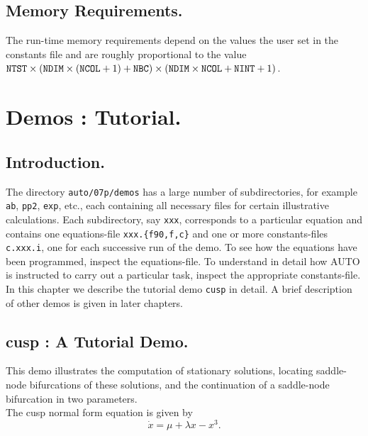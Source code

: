 \documentclass[12pt]{report}
\begin{document}
\section{ Memory Requirements.} \label{sec:Memory_requirements}
The run-time memory requirements depend on the values the user set in
the constants file and are roughly proportional to the value
${\tt NTST}\times({\tt NDIM}\times({\tt NCOL}+1)+{\tt NBC})\times
({\tt NDIM}\times{\tt NCOL}+{\tt NINT}+1)$.

\chapter{ \AUTO Demos : Tutorial.} \label{ch:Demos:_Tutorial}
\newpage
\section{ Introduction.} \label{sec:Tutorial_Introduction}
The directory {\tt auto/07p/demos} has a large number of subdirectories,
for example {\tt ab}, {\tt pp2}, {\tt exp}, etc.,
each containing all necessary files for certain illustrative calculations.
Each subdirectory, say {\tt xxx}, corresponds to a particular equation
and contains one equations-file {\tt xxx.\{f90,f,c\}}
and one or more constants-files {\tt c.xxx.i}, 
one for each successive run of the demo.
To see how the equations have been programmed, inspect the equations-file. 
To understand in detail how {\cal AUTO} is instructed to carry out a 
particular task, inspect the appropriate constants-file.
In this chapter we describe the tutorial demo {\tt cusp} in detail.
A brief description of other demos is given in later chapters.


\section{ cusp : A Tutorial Demo.} \label{sec:Demos_cusp}
This demo illustrates the computation of 
stationary solutions, locating saddle-node bifurcations of these
solutions, and the continuation of a saddle-node bifurcation in two
parameters.\\
The cusp normal form equation is given by
\begin{equation}
  \dot x = \mu + \lambda x - x^3.
\end{equation}
\end{document}
